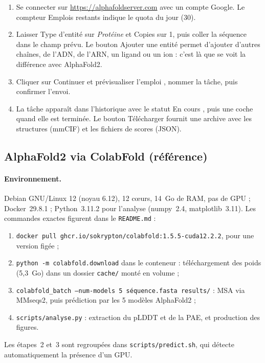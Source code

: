\begin{enumerate}
  \item Se connecter sur \url{https://alphafoldserver.com} avec un compte Google. Le compteur \og Emplois restants \fg{} indique le quota du jour (30).
  \item Laisser \og Type d'entité \fg{} sur \emph{Protéine} et \og Copies \fg{} sur 1, puis coller la séquence dans le champ prévu. Le bouton \og Ajouter une entité \fg{} permet d'ajouter d'autres chaînes, de l'ADN, de l'ARN, un ligand ou un ion : c'est là que se voit la différence avec AlphaFold2.
  \item Cliquer sur \og Continuer et prévisualiser l'emploi \fg{}, nommer la tâche, puis confirmer l'envoi.
  \item La tâche apparaît dans l'historique avec le statut \og En cours \fg{}, puis une coche quand elle est terminée. Le bouton \og Télécharger \fg{} fournit une archive avec les structures (mmCIF) et les fichiers de scores (JSON).
\end{enumerate}

\subsection{AlphaFold2 via ColabFold (référence)}

\paragraph{Environnement.} Debian GNU/Linux 12 (noyau 6.12), 12 cœurs, 14~Go de RAM, pas de GPU ; Docker~29.8.1 ; Python~3.11.2 pour l'analyse (numpy~2.4, matplotlib~3.11). Les commandes exactes figurent dans le \texttt{README.md} :
\begin{enumerate}
  \item \texttt{docker pull ghcr.io/sokrypton/colabfold:1.5.5-cuda12.2.2}, pour une version figée ;
  \item \texttt{python -m colabfold.download} dans le conteneur : téléchargement des poids (5,3~Go) dans un dossier \texttt{cache/} monté en volume ;
  \item \texttt{colabfold\_batch --num-models 5 séquence.fasta results/} : MSA via MMseqs2, puis prédiction par les 5 modèles AlphaFold2 ;
  \item \texttt{scripts/analyse.py} : extraction du pLDDT et de la PAE, et production des figures.
\end{enumerate}
Les étapes~2 et~3 sont regroupées dans \texttt{scripts/predict.sh}, qui détecte automatiquement la présence d'un GPU.

